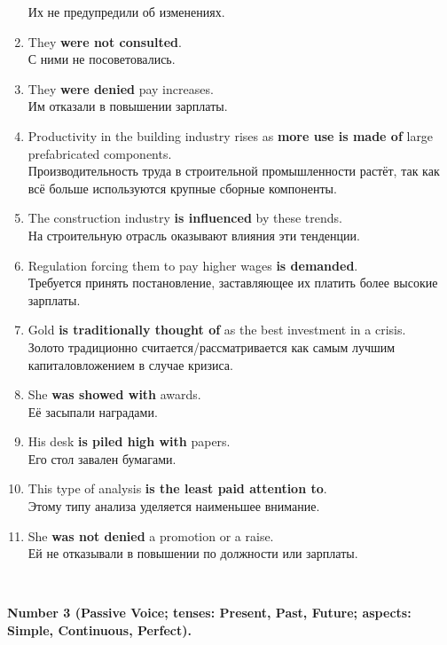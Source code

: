 \documentclass[main.tex]{subfiles}
\begin{document}
\begin{enumerate}[nosep]
	Их не предупредили об изменениях.
	\item They \textbf{were not consulted}.\\
	С ними не посоветовались.
	\item They \textbf{were denied} pay increases.\\
	Им отказали в повышении зарплаты.
	\item Productivity in the building industry rises as \textbf{more use is made of} large prefabricated components.\\
	Производительность труда в строительной промышленности растёт, так как всё больше используются крупные сборные компоненты.
	\item The construction industry \textbf{is influenced} by these trends.\\
	На строительную отрасль оказывают влияния эти тенденции.
	\item Regulation forcing them to pay higher wages \textbf{is demanded}.\\
	Требуется принять постановление, заставляющее их платить более высокие зарплаты.
	\item Gold \textbf{is traditionally thought of} as the best investment in a crisis.\\
	Золото традиционно считается/рассматривается как самым лучшим капиталовложением в случае кризиса.
	\item She \textbf{was showed with} awards.\\
	Её засыпали наградами.
	\item His desk \textbf{is piled high with} papers.\\
	Его стол завален бумагами.
	\item This type of analysis \textbf{is the least paid attention to}.\\
	Этому типу анализа уделяется наименьшее внимание.
	\item She \textbf{was not denied} a promotion or a raise.\\
	Ей не отказывали в повышении по должности или зарплаты.
\end{enumerate}
\ 

\textbf{Number 3 (Passive Voice; tenses: Present, Past, Future; aspects: Simple, Continuous, Perfect).}
\end{document}
